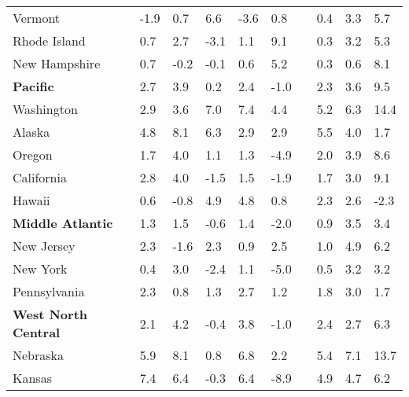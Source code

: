{\begin{tabular}{p{29mm} R{8.5mm} R{8.5mm} R{8.5mm} R{8.5mm} 
             R{8.5mm} p{0mm} R{11mm} R{11mm} R{12mm} }
\hspace{3mm}  Vermont  & -1.9 & 0.7 & 6.6 & -3.6 & 0.8 &  & 0.4 & 3.3 & 5.7 \\
\hspace{3mm}  Rhode Island  & 0.7 & 2.7 & -3.1 & 1.1 & 9.1 &  & 0.3 & 3.2 & 5.3 \\
\hspace{3mm}  New Hampshire  & 0.7 & -0.2 & -0.1 & 0.6 & 5.2 &  & 0.3 & 0.6 & 8.1 \\
\hspace{1mm} \textbf{Pacific}  & 2.7 & 3.9 & 0.2 & 2.4 & -1.0 &  & 2.3 & 3.6 & 9.5 \\
\hspace{3mm}  Washington  & 2.9 & 3.6 & 7.0 & 7.4 & 4.4 &  & 5.2 & 6.3 & 14.4 \\
\hspace{3mm}  Alaska  & 4.8 & 8.1 & 6.3 & 2.9 & 2.9 &  & 5.5 & 4.0 & 1.7 \\
\hspace{3mm}  Oregon  & 1.7 & 4.0 & 1.1 & 1.3 & -4.9 &  & 2.0 & 3.9 & 8.6 \\
\hspace{3mm}  California  & 2.8 & 4.0 & -1.5 & 1.5 & -1.9 &  & 1.7 & 3.0 & 9.1 \\
\hspace{3mm}  Hawaii  & 0.6 & -0.8 & 4.9 & 4.8 & 0.8 &  & 2.3 & 2.6 & -2.3 \\
\hspace{1mm} \textbf{Middle Atlantic}  & 1.3 & 1.5 & -0.6 & 1.4 & -2.0 &  & 0.9 & 3.5 & 3.4 \\
\hspace{3mm}  New Jersey  & 2.3 & -1.6 & 2.3 & 0.9 & 2.5 &  & 1.0 & 4.9 & 6.2 \\
\hspace{3mm}  New York  & 0.4 & 3.0 & -2.4 & 1.1 & -5.0 &  & 0.5 & 3.2 & 3.2 \\
\hspace{3mm}  Pennsylvania  & 2.3 & 0.8 & 1.3 & 2.7 & 1.2 &  & 1.8 & 3.0 & 1.7 \\
\hspace{1mm} \textbf{West North Central}  & 2.1 & 4.2 & -0.4 & 3.8 & -1.0 &  & 2.4 & 2.7 & 6.3 \\
\hspace{3mm}  Nebraska  & 5.9 & 8.1 & 0.8 & 6.8 & 2.2 &  & 5.4 & 7.1 & 13.7 \\
\hspace{3mm}  Kansas  & 7.4 & 6.4 & -0.3 & 6.4 & -8.9 &  & 4.9 & 4.7 & 6.2 \\

\end{tabular}}
